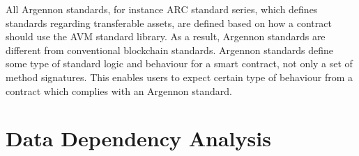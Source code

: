 All Argennon standards, for instance ARC standard series, which defines standards regarding transferable assets,
are defined based on how a contract should use the AVM standard library. As a result, Argennon standards are
different from conventional blockchain standards. Argennon standards define some type of standard logic and
behaviour for a smart contract, not only a set of method signatures. This enables users to expect certain type
of behaviour from a contract which complies with an Argennon standard.


\section{Data Dependency Analysis}\label{sec:concurrency}
